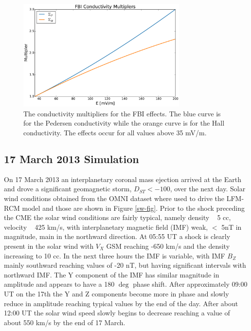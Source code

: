 \documentclass[draft,jgrga]{agutex}
\begin{document}
\begin{article}
\begin{figure}
\noindent\includegraphics[width=20pc]{JGRPaper-ConductMulti.pdf}
\caption{\label{fbi-multi-fig} 
The conductivity multipliers for the FBI effects.  The blue curve is for the Pedersen conductivity while the orange curve is for the Hall conductivity.  The effects occur for all values above 35 mV/m.  } 
\end{figure}

\subsection{17 March 2013 Simulation}
\label{sec-17mar13}

On 17 March 2013 an interplanetary coronal mass ejection arrived at the Earth and drove a significant geomagnetic storm, $D_{ST} < -100$, over the next day.  Solar wind conditions obtained from the OMNI dataset where used to drive the LFM-RCM model and those are shown in Figure \ref{sw-fig}.  Prior to the shock preceding the CME the solar wind conditions are fairly typical, namely density ~ 5 cc, velocity ~ 425 km/s, with interplanetary magnetic field (IMF) weak, $<$ 5nT in magnitude, main in the northward direction.  At 05:55 UT a shock is clearly present in the solar wind with $V_X$ GSM reaching -650 km/s and the density increasing to 10 cc.  In the next three hours the IMF is variable, with IMF $B_Z$ mainly southward reaching values of -20 nT, but having significant intervals with northward IMF.  The Y component of the IMF has similar magnitude in amplitude and appears to have a 180 $\deg$ phase shift.  After approximately  09:00 UT on the 17th the Y and Z components become more in phase and slowly reduce in amplitude reaching typical values by the end of the day.  After about 12:00 UT the solar wind speed slowly begins to decrease reaching a value of about 550 km/s by the end of 17 March.


\end{article}
\end{document}
